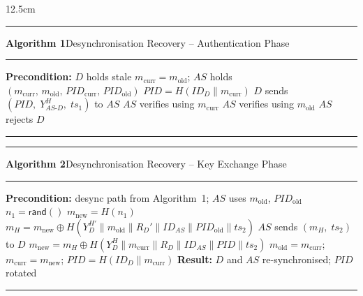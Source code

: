 \documentclass[border=4pt]{standalone}
\newcommand{\algheader}[2]{%
  \par\noindent\rule{\linewidth}{0.9pt}\par\vspace{1pt}%
  \noindent\textbf{Algorithm #1}\hspace{0.6em}#2\par\vspace{1pt}%
  \noindent\rule{\linewidth}{0.5pt}\par}
\newcommand{\algfooter}{\par\noindent\rule{\linewidth}{0.9pt}\par}
\begin{document}
\begin{varwidth}{12.5cm}

\algheader{1}{Desynchronisation Recovery -- Authentication Phase}
\begin{algorithmic}[1]
\Statex \textbf{Precondition:} $D$ holds stale $m_{\mathrm{curr}} = m_{\mathrm{old}}$;\;
       $AS$ holds $(m_{\mathrm{curr}},\,m_{\mathrm{old}},\,
       \mathit{PID}_{\mathrm{curr}},\,\mathit{PID}_{\mathrm{old}})$
\State $\mathit{PID} = H(\mathit{ID}_D \| m_{\mathrm{curr}})$
       \hfill{}
\State $D$ sends $(\mathit{PID},\; Y_{AS\text{-}D}^H,\; ts_1)$ to $AS$
    \State $AS$ verifies using $m_{\mathrm{curr}}$ \hfill{}
    \State $AS$ verifies using $m_{\mathrm{old}}$ \hfill{}
\Else
    \State $AS$ rejects $D$
\EndIf
\end{algorithmic}
\algfooter

\vspace{10pt}

\algheader{2}{Desynchronisation Recovery -- Key Exchange Phase}
\begin{algorithmic}[1]
\Statex \textbf{Precondition:} desync path from Algorithm~1;\;
       $AS$ uses $m_{\mathrm{old}}$, $\mathit{PID}_{\mathrm{old}}$
\State $n_1 = \mathsf{rand}()$
\State $m_{\mathrm{new}} = H(n_1)$
\State $m_H = m_{\mathrm{new}} \oplus
       H\!\left(Y_D^{H'} \| m_{\mathrm{old}} \| R_D' \|
       \mathit{ID}_{AS} \| \mathit{PID}_{\mathrm{old}} \| ts_2\right)$
\State $AS$ sends $(m_H,\; ts_2)$ to $D$
\State $m_{\mathrm{new}} = m_H \oplus
       H\!\left(Y_D^{H} \| m_{\mathrm{curr}} \| R_D \|
       \mathit{ID}_{AS} \| \mathit{PID} \| ts_2\right)$
       \hfill{}
\State $m_{\mathrm{old}} = m_{\mathrm{curr}}$;\quad
       $m_{\mathrm{curr}} = m_{\mathrm{new}}$;\quad
       $\mathit{PID} = H(\mathit{ID}_D \| m_{\mathrm{curr}})$
\Statex \textbf{Result:} $D$ and $AS$ re-synchronised; $\mathit{PID}$ rotated
\end{algorithmic}
\algfooter

\end{varwidth}
\end{document}
